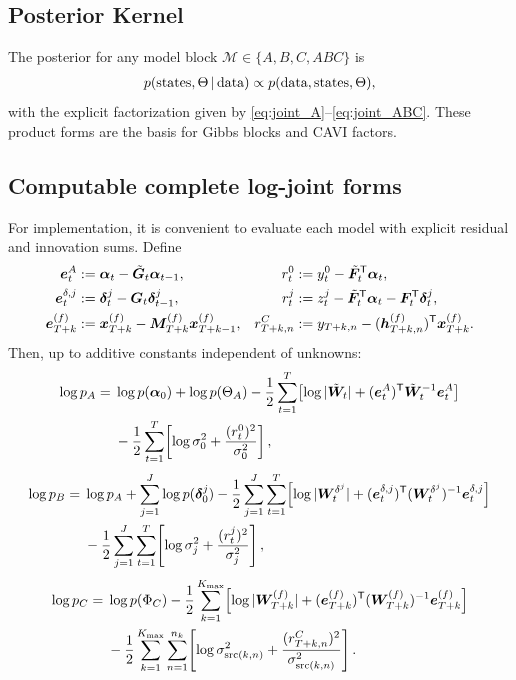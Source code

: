 \subsection{Posterior Kernel}
The posterior for any model block $\mathcal{M}\in\{A,B,C,ABC\}$ is
\begin{align}
p(\text{states},\Theta\,|\,\text{data})\propto
p(\text{data},\text{states},\Theta),
\label{eq:posterior_kernel}
\end{align}
with the explicit factorization given by \eqref{eq:joint_A}--\eqref{eq:joint_ABC}.
These product forms are the basis for Gibbs blocks and CAVI factors.

\subsection{Computable complete log-joint forms}
For implementation, it is convenient to evaluate each model with explicit residual and innovation sums.
Define
\begin{align}
\bm e_t^{A}&:=\bm\alpha_t-\tilde{\bm G}_t\bm\alpha_{t-1},
& r_t^{0}&:=y_t^0-\tilde{\bm F}_t^{\mathsf{T}}\bm\alpha_t, \nonumber\\
\bm e_t^{\delta,j}&:=\bm\delta_t^j-\bm G_t\bm\delta_{t-1}^j,
& r_t^{j}&:=z_t^j-\tilde{\bm F}_t^{\mathsf{T}}\bm\alpha_t-\bm F_t^{\mathsf{T}}\bm\delta_t^j,\nonumber\\
\bm e_{T+k}^{(f)}&:=\bm x_{T+k}^{(f)}-\bm M_{T+k}^{(f)}\bm x_{T+k-1}^{(f)},
& r_{T+k,n}^{C}&:=y_{T+k,n}-(\bm h_{T+k,n}^{(f)})^{\mathsf{T}}\bm x_{T+k}^{(f)}.
\label{eq:joint_residuals}
\end{align}
Then, up to additive constants independent of unknowns:
\begin{align}
\log p_A
=\;&
\log p(\bm\alpha_0)+\log p(\Theta_A)
-\frac12\sum_{t=1}^{T}\!\left[
\log|\tilde{\bm W}_t|+(\bm e_t^A)^{\mathsf{T}} \tilde{\bm W}_t^{-1}\bm e_t^A
\right] \nonumber\\
&-\frac12\sum_{t=1}^{T}\!\left[
\log \sigma_0^2+\frac{(r_t^0)^2}{\sigma_0^2}
\right],
\label{eq:log_joint_A}
\end{align}
\begin{align}
\log p_B
=\;&
\log p_A
+\sum_{j=1}^{J}\log p(\bm\delta_0^j)
-\frac12\sum_{j=1}^{J}\sum_{t=1}^{T}\!\left[
\log|\bm W_t^{\delta^j}|+(\bm e_t^{\delta,j})^{\mathsf{T}}(\bm W_t^{\delta^j})^{-1}\bm e_t^{\delta,j}
\right] \nonumber\\
&-\frac12\sum_{j=1}^{J}\sum_{t=1}^{T}\!\left[
\log \sigma_j^2+\frac{(r_t^j)^2}{\sigma_j^2}
\right],
\label{eq:log_joint_B}
\end{align}
\begin{align}
\log p_C
=\;&
\log p(\Phi_C)
-\frac12\sum_{k=1}^{K_{\max}}\!\left[
\log|\bm W_{T+k}^{(f)}|+(\bm e_{T+k}^{(f)})^{\mathsf{T}}(\bm W_{T+k}^{(f)})^{-1}\bm e_{T+k}^{(f)}
\right] \nonumber\\
&-\frac12\sum_{k=1}^{K_{\max}}\sum_{n=1}^{n_k}\!\left[
\log \sigma^2_{\mathrm{src}(k,n)}+\frac{(r_{T+k,n}^{C})^2}{\sigma^2_{\mathrm{src}(k,n)}}
\right].
\label{eq:log_joint_C}
\end{align}
